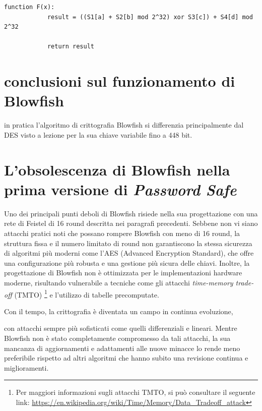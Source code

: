 \documentclass[a4paper,12pt]{report}
\begin{document}
	\begin{lstlisting}[style=pseudocode]
		function F(x):
			result = ((S1[a] + S2[b] mod 2^32) xor S3[c]) + S4[d] mod 2^32
			
			return result
	\end{lstlisting}
	\section*{conclusioni sul funzionamento di Blowfish}
	in pratica l'algoritmo di crittografia Blowfish si differenzia
	principalmente dal DES visto a lezione per la sua chiave variabile fino a
	448 bit. \cite{blfh-lenth-key}

	\section*{L'obsolescenza di Blowfish nella prima versione di
	\textit{Password Safe}}

		
		Uno dei principali punti deboli di Blowfish risiede nella sua
		progettazione con una rete di Feistel di 16 round descritta nei
		paragrafi precedenti. Sebbene non vi siano attacchi pratici noti che
		possano rompere Blowfish con meno di 16 round, la struttura fissa e il
		numero limitato di round non garantiscono la stessa sicurezza di
		algoritmi più moderni come l'AES (Advanced Encryption Standard), che
		offre una configurazione più robusta e una gestione più sicura delle
		chiavi. Inoltre, la progettazione di Blowfish non è ottimizzata per le
		implementazioni hardware moderne, risultando vulnerabile a tecniche come
		gli attacchi \textit{time-memory trade-off} (TMTO) \footnote{Per
		maggiori informazioni sugli attacchi TMTO, si può consultare il seguente
		link:
		\url{https://en.wikipedia.org/wiki/Time/Memory/Data_Tradeoff_attack}} e
		l'utilizzo di tabelle precomputate.

		Con il tempo, la crittografia è diventata un campo in continua
		evoluzione, \par con attacchi sempre più sofisticati come quelli
		differenziali e lineari. Mentre Blowfish non è stato completamente
		compromesso da tali attacchi, la sua mancanza di aggiornamenti e
		adattamenti alle nuove minacce lo rende meno preferibile rispetto ad
		altri algoritmi che hanno subito una revisione continua e miglioramenti.\\
\end{document}
